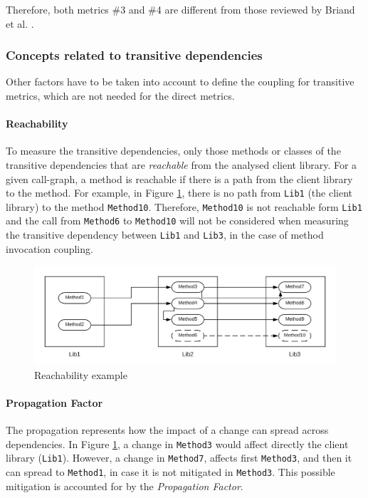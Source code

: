 Therefore, both metrics \#3 and \#4 are different from those reviewed by Briand et al. \cite{briand1999unified}.

\subsubsection{Concepts related to transitive dependencies}
Other factors have to be taken into account to define the coupling for transitive metrics, which are not needed for the direct metrics.

\paragraph{Reachability}
To measure the transitive dependencies, only those methods or classes of the transitive dependencies that are \textit{reachable} from the analysed client library. For a given call-graph, a method is reachable if there is a path from the client library to the method. For example, in Figure \ref{fig:reachability}, there is no path from \texttt{Lib1} (the client library) to the method \texttt{Method10}. Therefore, \texttt{Method10} is not reachable form \texttt{Lib1} and the call from \texttt{Method6} to \texttt{Method10} will not be considered when measuring the transitive dependency between \texttt{Lib1} and \texttt{Lib3}, in the case of method invocation coupling.

\begin{figure}[ht]
\begin{center}
\includegraphics[width=\textwidth]{figures/Reachability.png}
\caption{Reachability example}
\label{fig:reachability}
\end{center}
\end{figure}

\paragraph{Propagation Factor}
The propagation represents how the impact of a change can spread across dependencies. In Figure \ref{fig:reachability}, a change in \texttt{Method3} would affect directly the client  library (\texttt{Lib1}). However, a change in \texttt{Method7}, affects first \texttt{Method3}, and then it can spread to \texttt{Method1}, in case it is not mitigated in \texttt{Method3}. This possible mitigation is accounted for by the \textit{Propagation Factor}.

